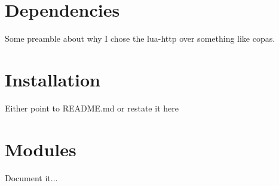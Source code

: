 \documentclass[12pt, oneside]{memoir}
\newcommand*{\novus}[0]{\nbright{\texttt{novus}}\xspace}
\newcommand*{\nbg}[0]{
    \pagecolor{novus-bg}
    \color{white}
}
\newcommand*{\naccent}[1]{
    {\color{novus-accent} #1}
}
\newcommand*{\nbright}[1]{
    {\color{novus-bright} #1}
}
\newlength{\drop}
\newcommand*{\novustitle}[0]{
\begingroup
    \drop = 0.1\textheight
    \hbox{%
        \hspace*{0.01\textwidth}%
        \naccent{\rule{2pt}{\textheight}}
        \hspace*{0.05\textwidth}%
        \parbox[b]{0.75\textwidth}{
        \vbox{%
            \vspace{\drop}
            {\noindent\Huge\bfseries The\\[0.5\baselineskip]
                \novus User Manual}\\[2\baselineskip]
            {\Large\itshape For creating lightweight discord  bots in lua.}\\[4\baselineskip]
            {\Large Magicks}\par
            \vspace{0.4\textheight}
            {\noindent\url{https://github.com/Mehgugs/novus}}\\[\baselineskip]
        }
        }
    }
    \vfill
    \null
\endgroup}
\begin{document}
    \nbg
    \begin{titlingpage}
        \thispagestyle{empty}
        \novustitle
    \end{titlingpage}
    \tableofcontents

    \chapter{Dependencies}
    Some preamble about why I chose the lua-http over something like copas.
    \pagebreak
    \chapter{Installation}
    Either point to README.md or restate it here
    \pagebreak
    \chapter{Modules}
    Document it...
\end{document}
